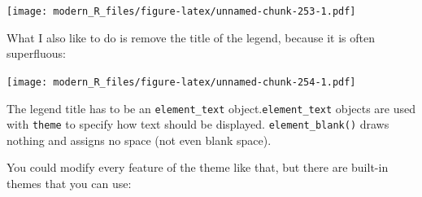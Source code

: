 \documentclass[]{gitbook}
\newenvironment{Shaded}{\begin{snugshade}}{\end{snugshade}}
\newcommand{\DataTypeTok}[1]{\textcolor[rgb]{0.13,0.29,0.53}{#1}}
\newcommand{\KeywordTok}[1]{\textcolor[rgb]{0.13,0.29,0.53}{\textbf{#1}}}
\newcommand{\NormalTok}[1]{#1}
\newcommand{\OperatorTok}[1]{\textcolor[rgb]{0.81,0.36,0.00}{\textbf{#1}}}
\newcommand{\StringTok}[1]{\textcolor[rgb]{0.31,0.60,0.02}{#1}}
\theoremstyle{definition}
\theoremstyle{definition}
\theoremstyle{definition}
\theoremstyle{remark}
\begin{document}
\texttt{[image: modern\_R\_files/figure-latex/unnamed-chunk-253-1.pdf]}

What I also like to do is remove the title of the legend, because it is
often superfluous:

\begin{Shaded}
\end{Shaded}

\texttt{[image: modern\_R\_files/figure-latex/unnamed-chunk-254-1.pdf]}

The legend title has to be an \texttt{element\_text}
object.\texttt{element\_text} objects are used with \texttt{theme} to
specify how text should be displayed. \texttt{element\_blank()} draws
nothing and assigns no space (not even blank space).

You could modify every feature of the theme like that, but there are
built-in themes that you can use:
\end{document}
